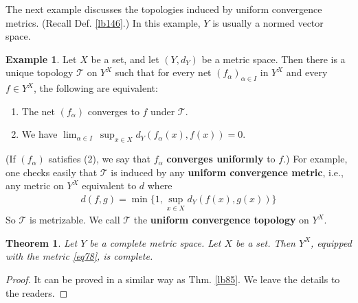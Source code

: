 \documentclass[12pt,b5paper,notitlepage]{article}
\theoremstyle{definition}
\newtheorem{eg}[df]{Example}
\theoremstyle{plain}
\newtheorem{thm}[df]{Theorem}
\newcommand{\mc}{\mathcal}
\newcommand{\Rbb}{\mathbb R}
\newcommand{\dps}{\displaystyle}
\newcommand{\eps}{\varepsilon}
\numberwithin{equation}{section}
\begin{document}
The next example discusses the topologies induced by uniform convergence metrics. (Recall Def. \ref{lb146}.) In this example, $Y$ is usually a normed vector space.

\begin{eg}\label{lb272}
Let $X$ be a set, and let $(Y,d_Y)$ be a metric space. Then there is a unique topology $\mc T$ on $Y^X$ such that for every net $(f_\alpha)_{\alpha\in I}$ in $Y^X$ and every $f\in Y^X$, the following are equivalent:
\begin{enumerate}[label=(\arabic*)]
\item The net $(f_\alpha)$ converges to $f$ under $\mc T$.
\item We have $\dps\lim_{\alpha\in I}~\sup_{x\in X} d_Y(f_\alpha(x),f(x))=0$.
\end{enumerate}
(If $(f_\alpha)$ satisfies (2), we say that $f_\alpha$  \textbf{converges uniformly}  to $f$.) For example, one checks easily that $\mc T$ is induced by any \textbf{uniform convergence metric},  i.e., any metric on $Y^X$ equivalent to $d$ where
\begin{align}\label{eq78}
d(f,g)=\min\Big\{1,\sup_{x\in X} d_Y(f(x),g(x))\Big\}
\end{align}
So $\mc T$ is metrizable. We call $\mc T$ the \textbf{uniform convergence topology}  on $Y^X$. 
\end{eg}

\begin{comment}
According to \eqref{eq78}, $\mc T$ has a basis
\begin{gather}\label{lb275}
\begin{gathered}
\mc B=\{U_{f,\eps}:f\in Y^X,\eps\in\Rbb_{>0}\}\quad\text{where}\\
U_{f,\eps}=\Big\{g\in Y^X:\sup_{x\in X}d_Y(f(x),g(x))<\eps   \Big\}
\end{gathered}
\end{gather}
\end{comment}

\begin{thm}\label{lb339}
Let $Y$ be a complete metric space. Let $X$ be a set. Then $Y^X$, equipped with the metric \eqref{eq78}, is complete.
\end{thm}

\begin{proof}
It can be proved in a similar way as Thm. \ref{lb85}. We leave the details to the readers.
\end{proof}
\end{document}
